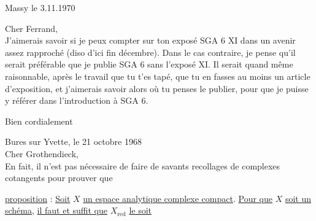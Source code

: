 \clearpage
{}

\begin{flushright}
Massy le 3.11.1970\\
\end{flushright}

\noindent Cher Ferrand,\\

J'aimerais savoir si je peux compter sur ton exposé SGA 6 XI dans un avenir assez rapproché (diso d'ici fin décembre). Dans le cas contraire, je pense qu'il serait préférable que je publie SGA 6 sans l'exposé XI. Il serait quand même raisonnable, après le travail que tu t'es tapé, que tu en fasses au moins un article d'exposition, et j'aimerais savoir alors où tu penses le publier, pour que je puisse y référer dans l'introduction à SGA 6.

Bien cordialement\\

\par\vspace*{0.43\textheight}
\noindent\hfill\parbox[c]{9mm}{}\hspace*{0.025\linewidth}\par
\clearpage
{}
\reversemarginpar{}\normalmarginpar
\noindent\hfill Bures sur Yvette, le 21 octobre 1968\\

\noindent Cher Grothendieck,\\

En fait, il n'est pas nécessaire de faire de savants recollages de complexes cotangents pour prouver que

\noindent \uline{proposition} : \uline{Soit} \(X\) \uline{un espace analytique complexe compact}. \uline{Pour que} \(X\) \uline{soit un schéma}, \uline{il faut et suffit que} \(X_{\mathrm{red}}\) \uline{le soit}

